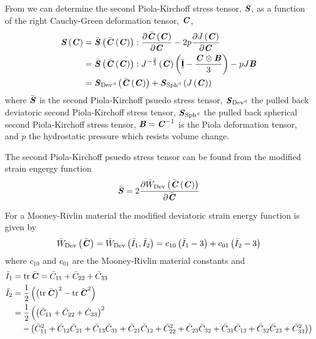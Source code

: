 From  we can determine the second Piola-Kirchoff stress tensor, $\boldsymbol{\mathit{S}}$, as a function of the right Cauchy-Green deformation tensor, $\boldsymbol{\mathit{C}}$, \ie
\begin{equation}
  \begin{split}
    \fnof{\tensor{S}}{\tensor{C}}
    &=\doubledotprod{\fnof{\bar{\tensor{S}}}{\fnof{\bar{\tensortwo{C}}}{\tensortwo{C}}}}{\delby{\fnof{\bar{\tensor{C}}}{\tensortwo{C}}}{\tensor{C}}}-2p\delby{\fnof{J}{\tensortwo{C}}}{\tensor{C}}\\
    &=\doubledotprod{\fnof{\bar{\tensor{S}}}{\fnof{\bar{\tensortwo{C}}}{\tensortwo{C}}}}{\fnof{J^{-\frac{2}{3}}}{\tensortwo{C}}\pbrac{\symidentitytensorfour-\dfrac{\tensorprod{\tensor{C}}{\tensor{B}}}{3}}}-pJ\tensor{B}\\
    &=\fnof{\tensor{S}_{\pullback{\Devop}{}}}{\fnof{\bar{\tensortwo{C}}}{\tensortwo{C}}}
    +\fnof{\tensor{S}_{\pullback{\Sphop}{}}}{\fnof{J}{\tensortwo{C}}}
  \end{split}
  \label{eqn:FiniteElasticityDecomposedSecondPKinC}
\end{equation}
where $\bar{\boldsymbol{\mathit{S}}}$ is the second Piola-Kirchoff psuedo stress
tensor, $\boldsymbol{\mathit{S}}_{ \operatorname{Dev}^{\triangleleft} }$ the pulled back
deviatoric second Piola-Kirchoff stress tensor,
$\boldsymbol{\mathit{S}}_{ \operatorname{Sph}^{\triangleleft} }$ the pulled back spherical second
Piola-Kirchoff stress tensor, $\boldsymbol{\mathit{B}}={\boldsymbol{\mathit{C}}}^{-1}$
is the Piola deformation tensor, and $p$ the hydrostatic pressure
which resists volume change.

The second Piola-Kirchoff psuedo stress tensor can be found from the modified strain engergy function \ie
\begin{equation}
  \bar{\boldsymbol{\mathit{S}}}=2 \dfrac{\partial  \bar{W}_{\operatorname{Dev}}\left(  \bar{\boldsymbol{\mathit{C}}}\left( \boldsymbol{\mathit{C}} \right)  \right) }{\partial \bar{\boldsymbol{\mathit{C}}}} 
\end{equation}

For a Mooney-Rivlin material the modified deviatoric strain energy function is given by
\begin{equation}
   \bar{W}_{\operatorname{Dev}}\left( \bar{\boldsymbol{\mathit{C}}} \right) = \bar{W}_{\operatorname{Dev}}\left( \bar{I}_{1},\bar{I}_{2} \right) =c_{10}\left( \bar{I}_{1}-3 \right)+c_{01}\left( \bar{I}_{2}-3 \right)
\end{equation}
where $c_{10}$ and $c_{01}$ are the Mooney-Rivlin material constants and
\begin{equation}
  \begin{split}
    \bar{I}_{1}&=\trace{}{\bar{\tensor{C}}}=\bar{C}_{11}+\bar{C}_{22}+\bar{C}_{33}\\
    \bar{I}_{2}&=\frac{1}{2}\pbrac{\pbrac{\trace{}{\bar{\tensor{C}}}}^{2}-\trace{}{\bar{\tensor{C}}^{2}}}
    \\ &=\dfrac{1}{2}\left(\pbrac{\bar{C}_{11}+\bar{C}_{22}+\bar{C}_{33}}^{2}\right. \\ &
    \quad\left.-\pbrac{\bar{C}_{11}^{2}+\bar{C}_{12}\bar{C}_{21}+\bar{C}_{13}\bar{C}_{31}+
      \bar{C}_{21}\bar{C}_{12}+\bar{C}_{22}^{2}+\bar{C}_{23}\bar{C}_{32}+\bar{C}_{31}\bar{C}_{13}+\bar{C}_{32}\bar{C}_{23}+\bar{C}_{33}^{2}}\right)
  \end{split}
\end{equation}

